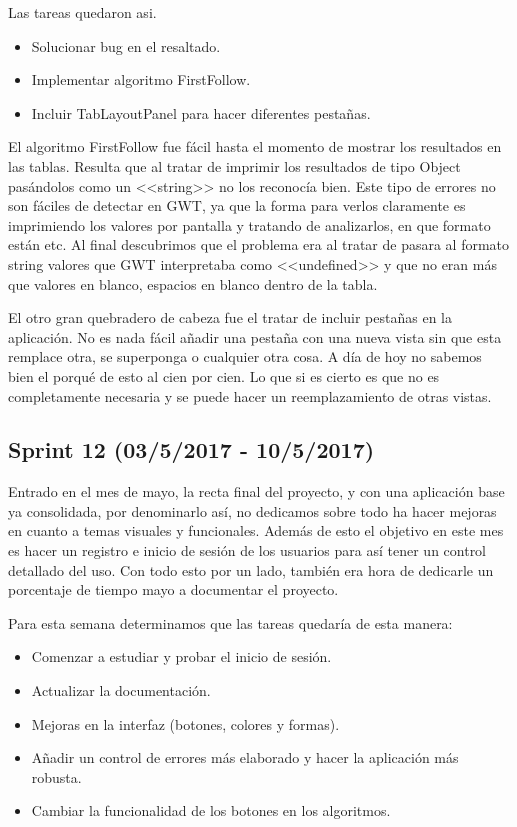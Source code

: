 Las tareas quedaron asi.

\begin{itemize}
\item Solucionar bug en el resaltado.
\item Implementar algoritmo FirstFollow.
\item Incluir TabLayoutPanel para hacer diferentes pestañas.
\end{itemize}

El algoritmo FirstFollow fue fácil hasta el momento de mostrar los resultados en las tablas. Resulta que al tratar de imprimir los resultados de tipo Object pasándolos como un <<string>> no los reconocía bien. Este tipo de errores no son fáciles de detectar en GWT, ya que la forma para verlos claramente es imprimiendo los valores por pantalla y tratando de analizarlos, en que formato están etc. Al final descubrimos que el problema era al tratar de pasara al formato string valores que GWT interpretaba como <<undefined>> y que no eran más que valores en blanco, espacios en blanco dentro de la tabla. 

El otro gran quebradero de cabeza fue el tratar de incluir pestañas en la aplicación. No es nada fácil añadir una pestaña con una nueva vista sin que esta remplace otra, se superponga o cualquier otra cosa. A día de hoy no sabemos bien el porqué de esto al cien por cien. Lo que si es cierto es que no es completamente necesaria y se puede hacer un reemplazamiento de otras vistas.

\subsection{Sprint 12 (03/5/2017 - 10/5/2017)}
Entrado en el mes de mayo, la recta final del proyecto, y con una aplicación base ya consolidada, por denominarlo así, no dedicamos sobre todo ha hacer mejoras en cuanto a temas visuales y funcionales. Además de esto el objetivo en este mes es hacer un registro e inicio de sesión de los usuarios para así tener un control detallado del uso.
Con todo esto por un lado, también era hora de dedicarle un porcentaje de tiempo mayo a documentar el proyecto. 

Para esta semana determinamos que las tareas quedaría de esta manera:

\begin{itemize}
\item Comenzar a estudiar y probar el inicio de sesión.
\item Actualizar la documentación.
\item Mejoras en la interfaz (botones, colores y formas).
\item Añadir un control de errores más elaborado y hacer la aplicación más robusta.
\item Cambiar la funcionalidad de los botones en los algoritmos.
\end{itemize}

